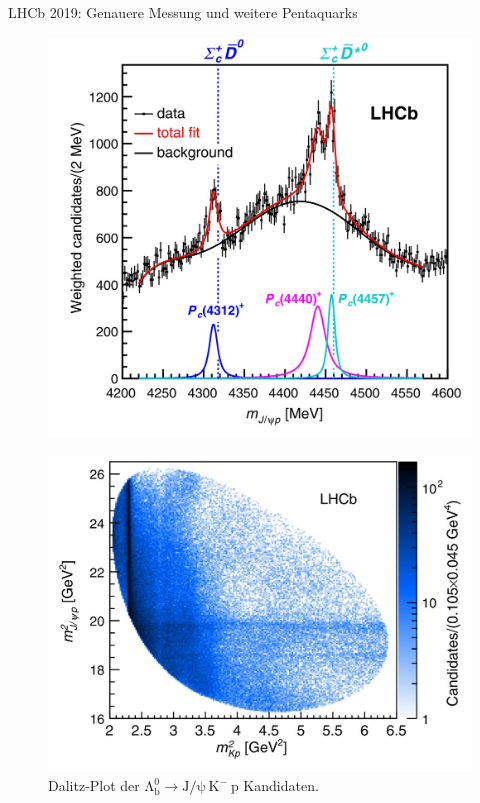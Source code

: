 \documentclass[aspectratio=169]{beamer} %
\begin{document}
      \begin{frame}{LHCb 2019: Genauere Messung und weitere Pentaquarks}
        \begin{minipage}{0.4\textwidth}
          \begin{figure}\includegraphics[width=\textwidth]{Images/76e29612-a8a4-4650-8573-5e331d33a362.jpg}
            \caption[S.~4]{\cite{Aaij.2019}}\end{figure}\pause
        \end{minipage}
        \hfill
        \begin{minipage}{0.58\textwidth}
          \begin{figure}\includegraphics[width=\textwidth, height=0.5\textheight, keepaspectratio]{Images/e4479e29-be8d-4b9c-bfc4-f1747ace3818.jpg}\\[-3mm]{\scriptsize Dalitz-Plot der $\mathrm{\Lambda_b^0} \to \mathrm{J}/\mathrm{\psi}\:\mathrm{K}^-\:\mathrm{p}$ Kandidaten.}

\end{figure}
\end{minipage}
\end{frame}
\end{document}
